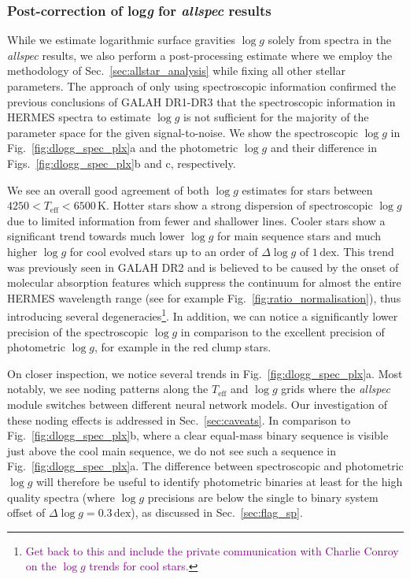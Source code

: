 \documentclass[
  journal=pasa,
  manuscript=research-paper, %
  year=2023,
  volume=37
]{cup-journal}
\newcommand{\SB}[1]{{\textcolor{purple}{#1}}}
\newcommand{\Teff}{$T_\mathrm{eff}$\xspace}
\newcommand{\logg}{$\log g$\xspace}
\begin{document}
\subsubsection{Post-correction of {log\textit{g}} for \textit{allspec} results}

While we estimate logarithmic surface gravities \logg solely from spectra in the \textit{allspec} results, we also perform a post-processing estimate where we employ the methodology of Sec.~\ref{sec:allstar_analysis} while fixing all other stellar parameters. The approach of only using spectroscopic information confirmed the previous conclusions of GALAH DR1-DR3 that the spectroscopic information in HERMES spectra to estimate \logg is not sufficient for the majority of the parameter space for the given signal-to-noise. We show the spectroscopic \logg in Fig.~\ref{fig:dlogg_spec_plx}a and the photometric \logg and their difference in Figs.~\ref{fig:dlogg_spec_plx}b and c, respectively.

We see an overall good agreement of both \logg estimates for stars between $4250 < T_\text{eff} < 6500\,\mathrm{K}$. Hotter stars show a strong dispersion of spectroscopic \logg due to limited information from fewer and shallower lines. Cooler stars show a significant trend towards much lower \logg for main sequence stars and much higher \logg for cool evolved stars up to an order of $\Delta \log g$ of $1\,\mathrm{dex}$. This trend was previously seen in GALAH DR2 \citep{Buder2018} and is believed to be caused by the onset of molecular absorption features which suppress the continuum for almost the entire HERMES wavelength range (see for example Fig.~\ref{fig:ratio_normalisation}), thus introducing several degeneracies\footnote{\SB{Get back to this and include the private communication with Charlie Conroy on the \logg trends for cool stars.}}. In addition, we can notice a significantly lower precision of the spectroscopic \logg in comparison to the excellent precision of photometric \logg, for example in the red clump stars.

On closer inspection, we notice several trends in Fig.~\ref{fig:dlogg_spec_plx}a. Most notably, we see noding patterns along the \Teff and \logg grids where the \textit{allspec} module switches between different neural network models. Our investigation of these noding effects is addressed in Sec.~\ref{sec:caveats}. In comparison to Fig.~\ref{fig:dlogg_spec_plx}b, where a clear equal-mass binary sequence is visible just above the cool main sequence, we do not see such a sequence in Fig.~\ref{fig:dlogg_spec_plx}a. The difference between spectroscopic and photometric \logg will therefore be useful to identify photometric binaries at least for the high quality spectra (where \logg precisions are below the single to binary system offset of $\Delta \log g = 0.3\,\mathrm{dex}$), as discussed in Sec.~\ref{sec:flag_sp}.
\end{document}
